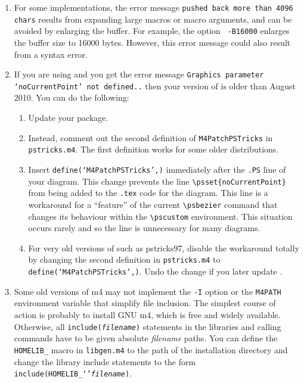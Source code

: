 \begin{enumerate}
\item
{}
 For some \Mfour implementations,
  the error message {\tt pushed back more than 4096 chars}
  results from expanding large macros or macro arguments, and can be
  avoided by enlarging the buffer.  For example, the option {\tt
  -B16000} enlarges the buffer size to 16000 bytes.  However, this
  error message could also result from a syntax error.

\item
{}
 If you are using \PSTricks and
  you get the error message {\tt Graphics parameter `noCurrentPoint'
  not defined..} then your version of \PSTricks is older than
  August 2010.  You can do the following:
\begin{enumerate}
\item Update your \PSTricks package.
\item Instead, comment out the second definition of {\tt M4PatchPSTricks} in
  {\tt pstricks.m4}.  The first definition works for some older
  \PSTricks distributions.
\item Insert {\tt define(`M4PatchPSTricks',)} immediately after the
   {\tt .PS} line of your diagram.
  This change prevents the line
  \verb|\psset{noCurrentPoint}| from being added to the {\tt .tex}
  code for the diagram.  This line is a workaround for a ``feature''
  of the current \PSTricks \verb|\psbezier| command that changes its
  behaviour within the \verb|\pscustom| environment.  This situation
  occurs rarely and so the line is unnecessary for many diagrams.
\item For very old versions of \PSTricks such as pstricks97, disable the
  workaround totally by changing the second definition in {\tt pstricks.m4}
  to {\tt define(`M4PatchPSTricks',)}.  Undo the change if you later update
  \PSTricks.
  \end{enumerate}

\item
{}\label{Mfourerror:}
  Some old versions of m4 may not implement
  the {\tt -I} option or the {\tt M4PATH} environment variable that
  simplify file inclusion.
  The simplest course of action is probably to install GNU m4, which is
  free and widely available. 
  Otherwise, all {\tt include({\sl filename})} statements in the libraries and
  calling commands have to be given absolute {\sl filename} paths. 
  You can define the {\tt HOMELIB\_} macro in {\tt libgen.m4} to the
  path of the installation directory and change the library
  include statements to the form {\tt include(HOMELIB\_`'{\sl filename})}.

\end{enumerate}

